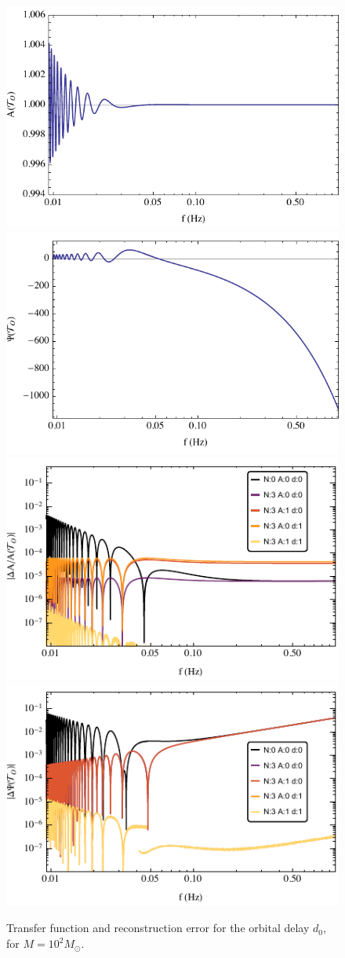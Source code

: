 \documentclass[aps,showpacs,twocolumn,
prd,superscriptaddress,nofootinbib]{revtex4-1}
\newcommand{\Msol}{M_{\odot}}
\begin{document}
\begin{figure}
  \centering
  \includegraphics[width=.48\linewidth]{plots/LISAtransferM1e2dOamp.pdf}
  \hspace{0.2cm}
  \includegraphics[width=.48\linewidth]{plots/LISAtransferM1e2dOphase.pdf}
  \includegraphics[width=.48\linewidth]{plots/LISAerrorM1e2dOamp.pdf}
  \hspace{0.2cm}
  \includegraphics[width=.48\linewidth]{plots/LISAerrorM1e2dOphase.pdf}
  \caption{Transfer function and reconstruction error for the orbital delay $d_{0}$, for $M=10^{2} \Msol$.}
  \label{fig:LISAerrorM1e2orb}
\end{figure}
\end{document}
